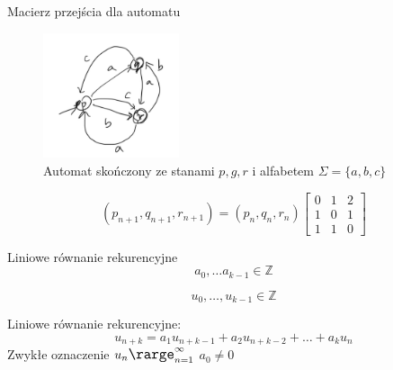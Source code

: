 \documentclass[handout]{beamer}
\theoremstyle{definition}
\theoremstyle{named}
\begin{document}
\begin{frame}{Macierz przejścia dla automatu}
\begin{figure}
    \centering
    \includegraphics[width=40mm]{img/Zaznaczenie_079.png}
    \caption{Automat skończony ze stanami $p, g, r$ i alfabetem $\Sigma = \{a,b,c \}$}
    \label{fig:my_label}
\end{figure}
    $$
    (p_{n+1}, q_{n+1}, r_{n+1}) 
    = (p_{n},q_{n},r_{n}) \begin{bmatrix}
    0 & 1 & 2 \\
    1 & 0 & 1 \\
    1 & 1 & 0
    \end{bmatrix}
    $$
\end{frame}

\begin{frame}{Liniowe równanie rekurencyjne}
    $$
        a_0, \ldots a_{k-1} \in \mathbb{Z} 
    $$

    $$
        u_0, \ldots, u_{k-1} \in \mathbb{Z}
    $$


    Liniowe równanie rekurencyjne: 
    $$
    u_{n+k}=a_{1} u_{n+k-1}+a_{2} u_{n+k-2}+\ldots+a_{k} u_{n}
    $$
    Zwykłe oznaczenie $\large u_n \rarge _{n=1}^{\infty}$
    $a_0 \neq 0$
\end{frame}
\end{document}
